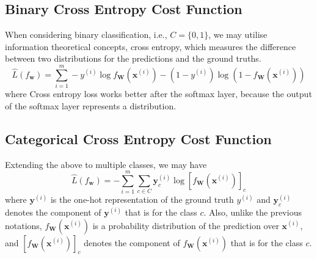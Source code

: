 \subsection*{Binary Cross Entropy Cost Function}

When considering binary classification, i.e., $C=\{0,1\}$, we may utilise information theoretical concepts, cross entropy, which measures the difference between two distributions for the predictions and the ground truths.  
%
\begin{equation}\label{equ:binarycrossentropyloss}
    \hat{L}(f_\textbf{w}) = \sum_{i=1}^m - y^{(i)}\log  f_{\textbf{W}}(\textbf{x}^{(i)})-  (1-y^{(i)})\log  (1-f_{\textbf{W}}(\textbf{x}^{(i)}))
\end{equation}
%
where 
Cross entropy loss works better after the softmax layer, because the output of the softmax layer represents a distribution. 


\subsection*{Categorical Cross Entropy Cost Function}

Extending the above to multiple classes, we may have 
\begin{equation}\label{equ:crossentropyloss}
    \hat{L}(f_\textbf{w}) = - \sum_{i=1}^m \sum_{c\in C} \textbf{y}^{(i)}_c\log  [f_{\textbf{W}}(\textbf{x}^{(i)})]_c
\end{equation}
where $\textbf{y}^{(i)}$ is the one-hot representation of the ground truth $y^{(i)}$ and $\textbf{y}^{(i)}_c$ denotes the component of $\textbf{y}^{(i)}$ that is for the class $c$. Also, unlike the previous notations, $f_{\textbf{W}}(\textbf{x}^{(i)})$ is a probability distribution   of the prediction over $\textbf{x}^{(i)}$, and $[f_{\textbf{W}}(\textbf{x}^{(i)})]_c$ denotes the component of $f_{\textbf{W}}(\textbf{x}^{(i)})$ that is for the class $c$. 

